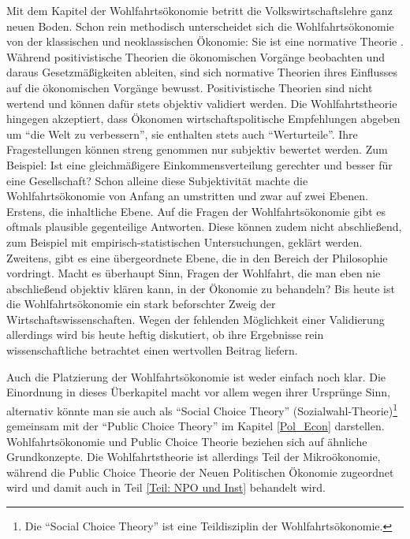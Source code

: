 Mit dem Kapitel der Wohlfahrtsökonomie betritt die Volkswirtschaftslehre ganz neuen Boden. Schon rein methodisch unterscheidet sich die Wohlfahrtsökonomie von der klassischen und neoklassischen Ökonomie: Sie ist eine normative Theorie \parencite[S. 77]{Scitovsky1941}. Während positivistische Theorien die ökonomischen Vorgänge beobachten und daraus Gesetzmäßigkeiten ableiten, sind sich normative Theorien ihres Einflusses auf die ökonomischen Vorgänge bewusst. Positivistische Theorien sind nicht wertend und können dafür stets objektiv validiert werden. Die Wohlfahrtstheorie hingegen akzeptiert, dass Ökonomen wirtschaftspolitische Empfehlungen abgeben um "`die Welt zu verbessern"', sie enthalten stets auch "`Werturteile"'. Ihre Fragestellungen können streng genommen nur subjektiv bewertet werden. Zum Beispiel: Ist eine gleichmäßigere Einkommensverteilung gerechter und besser für eine Gesellschaft?  Schon alleine diese Subjektivität machte die Wohlfahrtsökonomie von Anfang an umstritten und zwar auf zwei Ebenen. Erstens, die inhaltliche Ebene. Auf die Fragen der Wohlfahrtsökonomie gibt es oftmals plausible gegenteilige Antworten. Diese können zudem nicht abschließend, zum Beispiel mit empirisch-statistischen Untersuchungen, geklärt werden. Zweitens, gibt es eine übergeordnete Ebene, die in den Bereich der Philosophie vordringt. Macht es überhaupt Sinn, Fragen der Wohlfahrt, die man eben nie abschließend objektiv klären kann, in der Ökonomie zu behandeln? Bis heute ist die Wohlfahrtsökonomie ein stark beforschter Zweig der Wirtschaftswissenschaften. Wegen der fehlenden Möglichkeit einer Validierung allerdings wird bis heute heftig diskutiert, ob ihre Ergebnisse rein wissenschaftliche betrachtet einen wertvollen Beitrag liefern. 

Auch die Platzierung der Wohlfahrtsökonomie ist weder einfach noch klar. Die Einordnung in dieses Überkapitel macht vor allem wegen ihrer Ursprünge Sinn, alternativ könnte man sie auch als "`Social Choice Theory"' (Sozialwahl-Theorie)\footnote{Die "`Social Choice Theory"' ist eine Teildisziplin der Wohlfahrtsökonomie.} gemeinsam mit der "`Public Choice Theory"' im Kapitel \ref{Pol_Econ} darstellen. Wohlfahrtsökonomie und Public Choice Theorie beziehen sich auf ähnliche Grundkonzepte. Die Wohlfahrtstheorie ist allerdings Teil der Mikroökonomie, während die Public Choice Theorie der Neuen Politischen Ökonomie zugeordnet wird und damit auch in Teil \ref{Teil: NPO und Inst} behandelt wird. 

